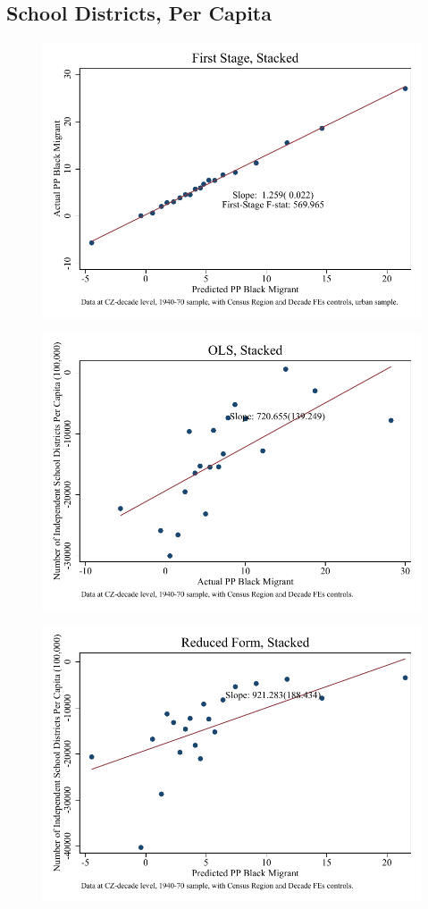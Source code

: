 \documentclass{article}
\begin{document}
\subsection{School Districts, Per Capita}

\clearpage
\begin{figure}
\centering
\includegraphics{figures/simplefigs/stacked_schdist_ind_pc_C3_urban_fs.pdf}
\end{figure}
\clearpage
\begin{figure}
\centering
\includegraphics{figures/simplefigs/stacked_schdist_ind_pc_C3_urban_ols.pdf}
\end{figure}
\clearpage
\begin{figure}
\centering
\includegraphics{figures/simplefigs/stacked_schdist_ind_pc_C3_urban_rf.pdf}
\end{figure}
\clearpage
\end{document}
